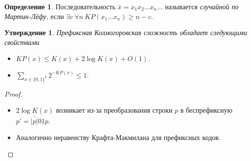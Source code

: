 \documentclass[12pt]{article}
\theoremstyle{definition}
\newtheorem{definition}{Определение}
\theoremstyle{plain}
\newtheorem{statement}{Утверждение}[section]
\theoremstyle{remark}
\begin{document}
\begin{definition}
    Последовательность $\bar x = x_1x_2\dotso x_n\dotso$ называется \emph{случайной по
    Мартин-Лёфу}, если $\exists c\ \forall n\ KP(x_1\dotso x_n) \ge n-c$.
\end{definition}

\begin{statement}
    Префиксная Колмогоровская сложность обладает следующими свойствами
\begin{itemize}
    \item $KP(x)\le K(x) + 2\log K(x) + O(1)$.
    \item $\sum_{x\in \{0,1\}^k} 2^{-KP(x)} \le 1$.
\end{itemize}
\end{statement}
\begin{proof}\mbox{}
\begin{itemize}
    \item $2\log K(x)$ возникает из-за преобразования строки $p$ 
        в беспрефиксную $p' = \overline{\overline{|p|}}01p$.
    \item Аналогично неравенству Крафта-Макмилана для префиксных кодов.
\end{itemize}
\end{proof}
\end{document}

